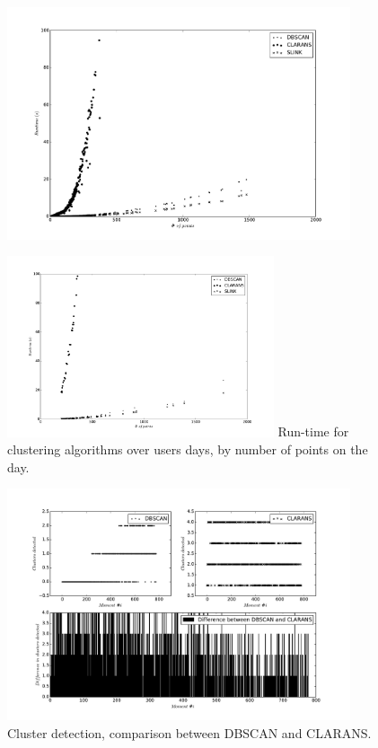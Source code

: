 
\begin{figure}
    \centering
    \includegraphics[width=0.9\textwidth]{plots/moment_runtime_scatter.pdf}
\end{figure}

\begin{figure}
    \centering
    \includegraphics[width=0.7\textwidth]{plots/days_runtime_scatter.pdf}
    {Run-time for clustering algorithms over users days, by number of points on the day. }
\end{figure}

\begin{figure}
    \centering
    \includegraphics[width=0.9\textwidth]{plots/dbscan_vs_clarans.pdf}
    {Cluster detection, comparison between DBSCAN and CLARANS. }
\end{figure}

